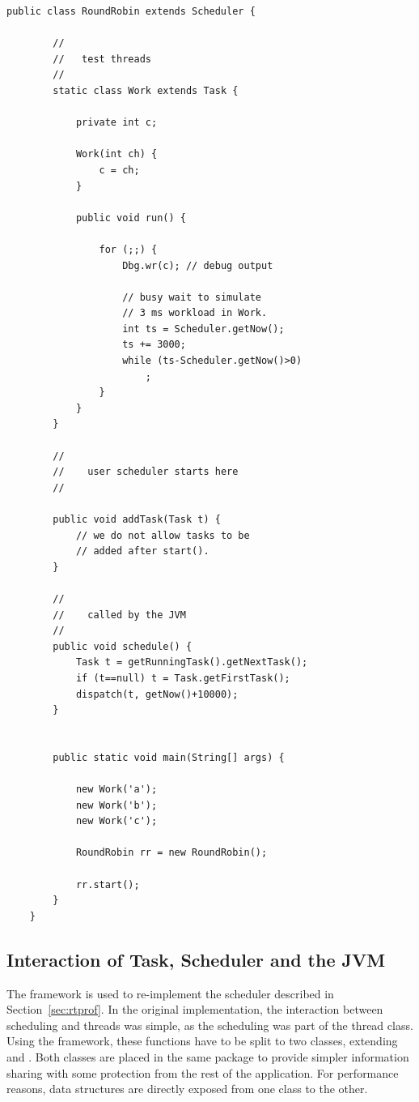 \pagebreak
\begin{lstlisting}[caption=A very simple scheduler,
label=lst:arch:rt:user:example]
    public class RoundRobin extends Scheduler {

        //
        //   test threads
        //
        static class Work extends Task {

            private int c;

            Work(int ch) {
                c = ch;
            }

            public void run() {

                for (;;) {
                    Dbg.wr(c); // debug output

                    // busy wait to simulate
                    // 3 ms workload in Work.
                    int ts = Scheduler.getNow();
                    ts += 3000;
                    while (ts-Scheduler.getNow()>0)
                        ;
                }
            }
        }

        //
        //    user scheduler starts here
        //

        public void addTask(Task t) {
            // we do not allow tasks to be
            // added after start().
        }

        //
        //    called by the JVM
        //
        public void schedule() {
            Task t = getRunningTask().getNextTask();
            if (t==null) t = Task.getFirstTask();
            dispatch(t, getNow()+10000);
        }


        public static void main(String[] args) {

            new Work('a');
            new Work('b');
            new Work('c');

            RoundRobin rr = new RoundRobin();

            rr.start();
        }
    }
\end{lstlisting}


\subsection{Interaction of Task, Scheduler and the JVM}

The framework is used to re-implement the scheduler described in
Section~\ref{sec:rtprof}. In the original implementation, the
interaction between scheduling and threads was simple, as the
scheduling was part of the thread class. Using the framework, these
functions have to be split to two classes, extending  and
. Both classes are placed in the same package to
provide simpler information sharing with some protection from the
rest of the application. For performance reasons, data structures are
directly exposed from one class to the other.

